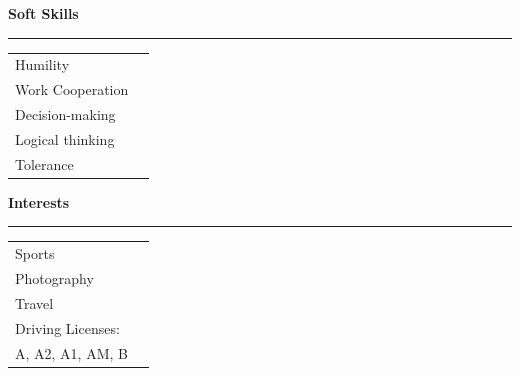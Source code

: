 \documentclass[11pt,a4paper]{article}
\newcommand{\cvsection}[1]{
    \vspace{0.5em}
    \noindent\textbf{\large #1}
    \vspace{0.5em}
    \hrule\vspace{0.5em}
}
\begin{document}
\begin{minipage}{0.25\textwidth}
    
    \cvsection{Soft Skills}
    \begin{tabular}{@{}ll@{}}
        Humility            \\
        Work Cooperation    \\
        Decision-making     \\
        Logical thinking    \\
        Tolerance
    \end{tabular}
    
    \cvsection{Interests}
    \begin{tabular}{@{}ll@{}}
        Sports       \\
        Photography  \\
        Travel\\
        Driving Licenses: \\
        A, A2, A1, AM, B \\
    \end{tabular}
\end{minipage}
\hfill
\end{document}
